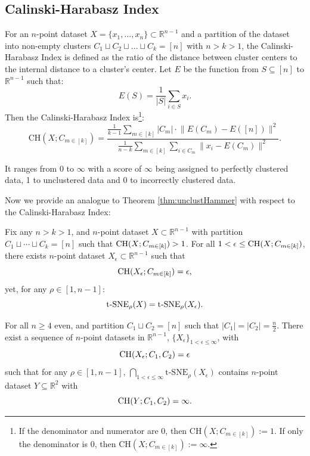 
\pagebreak
\subsection{Calinski-Harabasz Index}\label{sec:CHindex}
For an $n$-point dataset $X = \{x_1, \dots, x_n\} \subset \mathbb{R}^{n-1}$ and a partition of the dataset into non-empty clusters $C_1 \sqcup C_2 \sqcup \dots \sqcup C_k = [n]$ with $n > k > 1$, the Calinski-Harabasz Index is defined as the ratio of the distance between cluster centers to the  internal distance to a cluster's center. Let $E$ be the function from $S \subseteq [n]$ to $\mathbb{R}^{n-1}$ such that:
$$E(S) = \frac{1}{|S|}\sum_{i \in S} x_i.$$
Then the Calinski-Harabasz Index is\footnote{If the denominator and numerator are $0$, then $\text{CH}(X; C_{m \in [k]}) := 1$. If only the denominator is 0, then $\text{CH}(X; C_{m \in [k]}) := \infty$.}:
$$\text{CH}(X; C_{m \in [k]}) = \frac{\frac{1}{k-1}\sum_{m \in [k]} |C_m|\cdot \lVert E(C_m) - E([n])\rVert^2}{\frac{1}{n-k}\sum_{m \in [k]} \sum_{i \in C_m} \lVert x_i - E(C_m)\rVert^2}.$$

It ranges from $0$ to $\infty$ with a score of $\infty$ being assigned to perfectly clustered data, 1 to unclustered data and 0 to incorrectly clustered data. 

Now we provide an analogue to Theorem \ref{thm:unclustHammer} with respect to the Calinski-Harabasz Index:


\begin{theorem}
\label{thm:unclustHammerCH}
    Fix any $n > k > 1$, and $n$-point dataset ${X} \subset \mathbb{R}^{n-1}$ with partition $C_1 \sqcup \cdots \sqcup C_k = [n]$ such that $\textup{CH}({X}; C_{m\in[k]}) > 1$. For all $1 < \epsilon \leq \textup{CH}({X}; C_{m\in[k]})$, there exists $n$-point dataset ${X}_\epsilon \subset \mathbb{R}^{n-1}$ such that 
    $$\textup{CH}({X}_\epsilon; C_{m\in[k]}) = \epsilon, $$
    yet, for any $\rho \in [1, n-1]$:
    $${\operatorname*{t-SNE}}_\rho({X}) = {\operatorname*{t-SNE}}_\rho({X}_\epsilon).$$
\end{theorem}

\begin{corollary}
\label{cor:twoCluster_n_UnclusteredCH}
    For all $n \geq 4$ even, and partition $C_1 \sqcup C_2 = [n]$ such that $|C_1|=|C_2|=\frac{n}{2}$. There exist a sequence of $n$-point datasets in $\mathbb{R}^{n-1}$, $\{ {X}_\epsilon\}_{1 < \epsilon \leq \infty}$, with 
        $$\textup{CH}({X}_\epsilon; C_1, C_2) = \epsilon$$
    such that for any $\rho \in [1, n-1]$, $\bigcap_{1<\epsilon \leq \infty}\text{t-SNE}_\rho({X}_\epsilon)$ contains $n$-point dataset ${Y} \subseteq \mathbb{R}^2$ with
    $$\textup{CH}(Y; C_1,C_2) = \infty.$$ 
\end{corollary}

